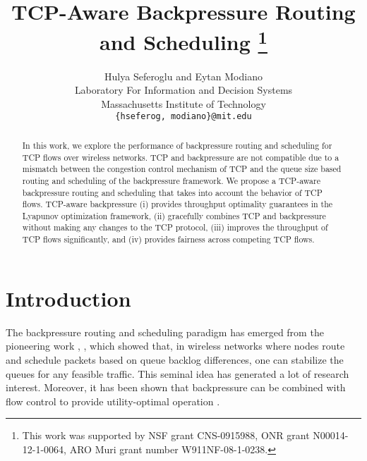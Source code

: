 \documentclass[conference]{IEEEtran}
\begin{document}
\title{TCP-Aware Backpressure Routing and Scheduling
\thanks{This work was supported by NSF grant CNS-0915988, ONR grant N00014-12-1-0064, ARO Muri grant number W911NF-08-1-0238.}
}



\author{Hulya Seferoglu and Eytan Modiano\\
{Laboratory For Information and Decision Systems}\\
{Massachusetts Institute of Technology}\\
{ \small \tt \{hseferog, modiano\}@mit.edu}\\
}



\maketitle

\begin{abstract}
In this work, we explore the performance of backpressure routing and scheduling for TCP flows over wireless networks. TCP and backpressure are not compatible due to a mismatch between the congestion control mechanism of TCP and the queue size based routing and scheduling of the backpressure framework. We propose a TCP-aware backpressure routing and scheduling that takes into account the behavior of TCP flows. TCP-aware backpressure (i) provides throughput optimality guarantees in the Lyapunov optimization framework, (ii) gracefully combines TCP and backpressure without making any changes to the TCP protocol, (iii) improves the throughput of TCP flows significantly, and (iv) provides fairness across competing TCP flows. \end{abstract}





\section{Introduction}\label{sec:intro}
The backpressure routing and scheduling paradigm has emerged from the pioneering work \cite{tass_eph1}, \cite{tass_eph2}, which showed that, in wireless networks where nodes route and schedule packets based on queue backlog differences, one can stabilize the queues for any feasible traffic. This seminal idea has generated a lot of research interest. Moreover, it has been shown that backpressure can be combined with flow control to provide utility-optimal operation \cite{neely_mod}.
\end{document}
